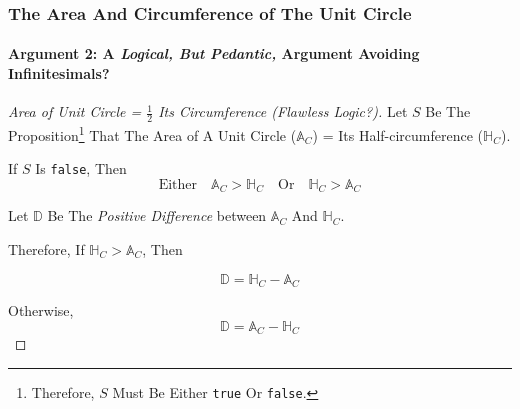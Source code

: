 \begin{frame}
\frametitle{The Area And Circumference of The Unit Circle}
\framesubtitle{Argument 2: A \textit{Logical, But Pedantic,} Argument Avoiding Infinitesimals\alert{?}}
\label{slide:arg-2-archimedes-1}
\begin{proof}[Area of Unit Circle = $\frac{1}{2}$ Its Circumference ({\tiny Flawless Logic?})]
\let\qed\relax %
Let \alert{$S$} Be The Proposition\footnote{Therefore, $S$ Must Be Either \texttt{true} Or \texttt{false}.} That \alert{The Area of A Unit Circle ($\mathbb{A}_C$) = Its Half-circumference ($\mathbb{H}_C$)}.

\alert{If} $S$ Is \texttt{false}, \alert{Then} 
\begin{equation}
\label{eq:ac-hc}
\text{Either}\quad\mathbb{A}_C>\mathbb{H}_C\quad\text{Or}\quad\mathbb{H}_C>\mathbb{A}_C
\end{equation}

Let $\mathbb{D}$ Be The \textit{Positive Difference} between $\mathbb{A}_C$ And $\mathbb{H}_C$.

Therefore, If $\mathbb{H}_C>\mathbb{A}_C$, Then

\begin{equation}
\label{eq:d=hc-ac}
\mathbb{D}=\mathbb{H}_C-\mathbb{A}_C
\end{equation}

Otherwise,
\begin{equation}
\label{eq:d=ac-hc}
\mathbb{D}=\mathbb{A}_C-\mathbb{H}_C
\end{equation}

\end{proof}
\end{frame}
